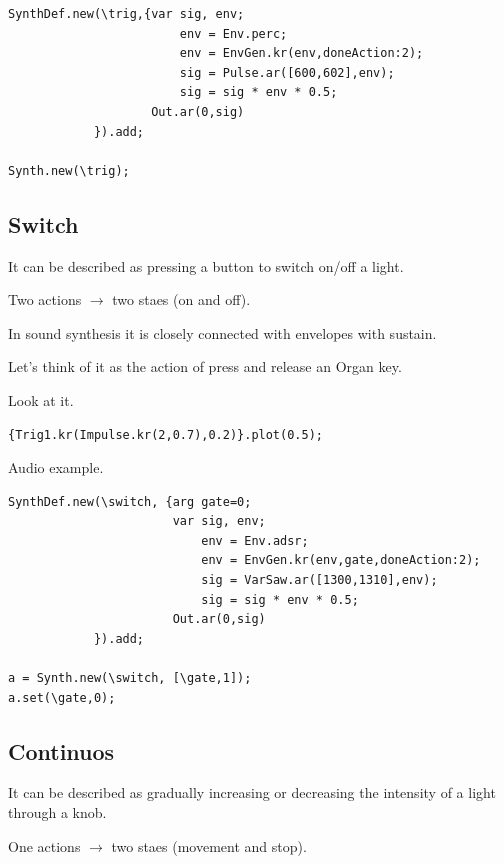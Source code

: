 \begin{lstlisting}[frame=single] 
SynthDef.new(\trig,{var sig, env;
                        env = Env.perc;
                        env = EnvGen.kr(env,doneAction:2);
                        sig = Pulse.ar([600,602],env);
                        sig = sig * env * 0.5;
                    Out.ar(0,sig)
            }).add;
            
Synth.new(\trig);
\end{lstlisting}

\subsection{Switch}\label{switch}

It can be described as pressing a button to switch on/off a light.

Two actions \(\rightarrow\) two staes (on and off).

In sound synthesis it is closely connected with envelopes with sustain.

Let's think of it as the action of press and release an Organ key.

Look at it.

\begin{lstlisting}[frame=single] 
{Trig1.kr(Impulse.kr(2,0.7),0.2)}.plot(0.5); 
\end{lstlisting}

Audio example.

\begin{lstlisting}[frame=single] 
SynthDef.new(\switch, {arg gate=0;
                       var sig, env;
                           env = Env.adsr;
                           env = EnvGen.kr(env,gate,doneAction:2);
                           sig = VarSaw.ar([1300,1310],env);
                           sig = sig * env * 0.5;
                       Out.ar(0,sig)
            }).add;
 
a = Synth.new(\switch, [\gate,1]);
a.set(\gate,0);           
\end{lstlisting}

\subsection{Continuos}\label{continuos}

It can be described as gradually increasing or decreasing the intensity of a light through a knob.

One actions \(\rightarrow\) two staes (movement and stop).

